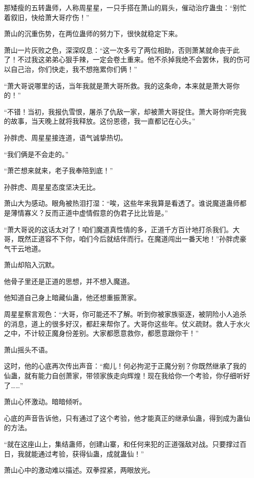 \begin{this_body}
那矮瘦的五转蛊师，人称周星星，一只手搭在萧山的肩头，催动治疗蛊虫：“别忙着叙旧，快给萧大哥疗伤！”

萧山的沉重伤势，在两位蛊师的努力下，很快就稳定下来。

萧山一片灰败之色，深深叹息：“这一次多亏了两位相助，否则萧某就命丧于此了！不过我这弟弟心狠手辣，一定会卷土重来。他不杀掉我绝不会罢休，我的伤可以自己治，你们快走，我不想拖累你们俩！”

“萧大哥说哪里的话，当年我就是萧大哥所救。我的这条命，本来就是萧大哥你的！”

“不错！当初，我报仇雪恨，屠杀了仇敌一家，却被萧大哥捉住。萧大哥你听完我的故事，当天晚上就将我释放。这份恩德，我一直都记在心头。”

孙胖虎、周星星接连道，语气诚挚热切。

“我们俩是不会走的。”

“萧芒想来就来，老子我奉陪到底！”

孙胖虎、周星星态度坚决无比。

萧山大为感动。眼角被热泪打湿：“唉，这些年来我算是看透了。谁说魔道蛊师都是薄情寡义？反而正道中虚情假意的伪君子比比皆是。”

“萧大哥说的这话太对了！咱们魔道真性情的多，正道千方百计地打杀我们。大哥，既然正道容不下你，咱们今后就结伴而行。在魔道闯出一番天地！”孙胖虎豪气干云地道。

萧山却陷入沉默。

他骨子里还是正道的思想，并不想入魔道。

他知道自己身上暗藏仙蛊，他还想重振萧家。

周星星察言观色：“大哥，你可能还不了解。听到你被家族驱逐，被阴险小人追杀的消息，道上的很多好汉，都赶来帮你了。大哥你这些年。仗义疏财。救人于水火之中，不计较正魔身份差别。大家都愿意救你，都愿意跟你干！”

萧山摇头不语。

这时，他的心底再次传出声音：“痴儿！何必拘泥于正魔分别？你既然继承了我的仙蛊，就有能力自创萧家，带领家族走向辉煌！现在我给你一个考验，你仔细听好了……”

萧山心怀激动。暗暗倾听。

心底的声音告诉他，只有通过了这个考验，他才能真正的继承仙蛊，得到成为蛊仙的方法。

“就在这座山上，集结蛊师，创建山寨，和任何来犯的正道强敌对战。只要撑过百日，我就能通过考验，获得仙蛊，成就蛊仙！”

萧山心中的激动难以描述。双拳捏紧，两眼放光。


\end{this_body}
